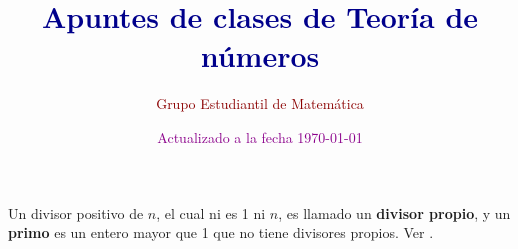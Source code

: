 \documentclass{gemnumber} %
\title{\Huge\bfseries\textcolor{DarkBlue}{Apuntes de clases de Teoría de números}}
\author{\LARGE\textcolor{DarkRed}{Grupo Estudiantil de Matemática}}
\date{\textcolor{DarkMagenta}{Actualizado a la fecha \today}}
\begin{document}
\maketitle



\newpage

\renewcommand{\contentsname}{Tabla de contenido}

\tableofcontents













Un divisor positivo de $n$, el cual ni es 1 ni $n$, es llamado un \textbf{divisor propio}, y un \textbf{primo} es un entero mayor que 1 que no tiene divisores propios. Ver \cite{niven}.

\nocite{*}
\printbibliography
\end{document}

